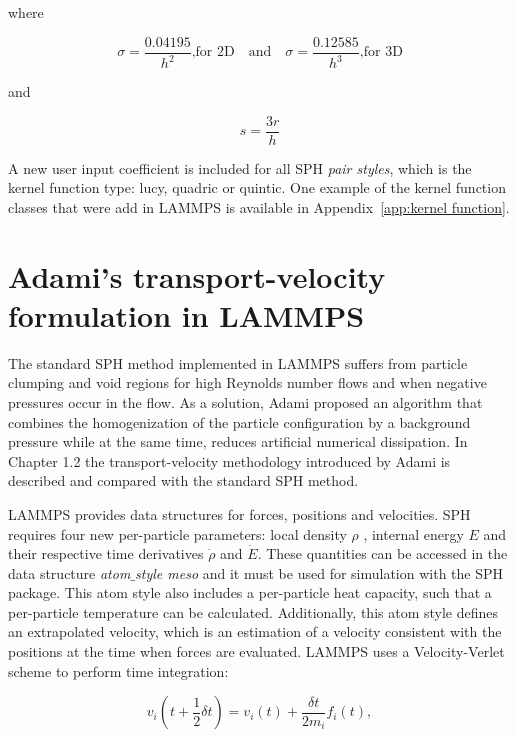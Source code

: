 where

\begin{equation}
 \sigma = \frac{0.04195}{h^2} \text{,for 2D} \quad \text{and} \quad \sigma = \frac{0.12585}{h^3} \text{,for 3D}
\end{equation}

and 

\begin{equation}
 s = \frac{3r}{h}
\end{equation}

A new user input coefficient is included for all SPH \textit{pair styles}, which is the kernel function type: lucy, quadric or quintic. One example of the kernel function classes
that were add in LAMMPS is available in Appendix~\ref{app:kernel function}.

\section{Adami's transport-velocity formulation in LAMMPS}
\label{sec:section 6}


The standard SPH method implemented in LAMMPS suffers from particle clumping and void regions for high Reynolds number flows and when negative pressures occur in the flow.
As a solution, Adami \cite{adami_transport-velocity_2013} proposed an algorithm that combines the homogenization of the particle configuration by a background pressure while at the same
time, reduces artificial numerical dissipation. In Chapter 1.2 the transport-velocity methodology introduced by Adami is described and compared with the standard SPH method.\par

LAMMPS provides data structures for forces, positions and velocities. SPH requires four new per-particle parameters: local density $\rho$ , internal energy $E$ and their respective
time derivatives $\dot{\rho}$ and $\dot{E}$. These quantities can be accessed in the data structure \textit{atom$\_$style meso} and it must be used for simulation with the SPH package.
This atom style also includes a per-particle heat capacity, such that a per-particle temperature can be calculated. Additionally, this atom style defines an extrapolated velocity,
which is an estimation of a velocity consistent with the positions at the time when forces are evaluated. LAMMPS uses a Velocity-Verlet scheme to perform time integration:

\begin{equation}
v_{i}(t+\frac{1}{2}\delta t) = v_{i}(t) + \frac{\delta t}{2m_{i}} f_{i}(t),
\end{equation}

